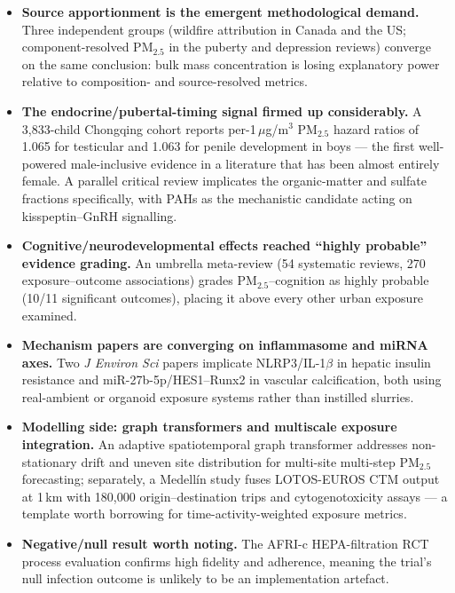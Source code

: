 \documentclass[10pt]{article}
\begin{document}
\footnotesize
\begin{itemize}
\item \textbf{Source apportionment is the emergent methodological demand.} Three
independent groups (wildfire attribution in Canada and the US; component-resolved
PM$_{2.5}$ in the puberty and depression reviews) converge on the same conclusion: bulk
mass concentration is losing explanatory power relative to composition- and
source-resolved metrics.

\item \textbf{The endocrine/pubertal-timing signal firmed up considerably.}
A 3{,}833-child Chongqing cohort reports per-1\,$\mu$g/m$^3$ PM$_{2.5}$ hazard ratios of
1.065 for testicular and 1.063 for penile development in boys --- the first well-powered
male-inclusive evidence in a literature that has been almost entirely female. A parallel
critical review implicates the organic-matter and sulfate fractions specifically, with
PAHs as the mechanistic candidate acting on kisspeptin--GnRH signalling.

\item \textbf{Cognitive/neurodevelopmental effects reached ``highly probable''
evidence grading.} An umbrella meta-review (54 systematic reviews, 270 exposure--outcome
associations) grades PM$_{2.5}$--cognition as highly probable (10/11 significant
outcomes), placing it above every other urban exposure examined.

\item \textbf{Mechanism papers are converging on inflammasome and miRNA axes.}
Two \textit{J Environ Sci} papers implicate NLRP3/IL-1$\beta$ in hepatic insulin
resistance and miR-27b-5p/HES1--Runx2 in vascular calcification, both using
real-ambient or organoid exposure systems rather than instilled slurries.

\item \textbf{Modelling side: graph transformers and multiscale exposure integration.}
An adaptive spatiotemporal graph transformer addresses non-stationary drift and uneven
site distribution for multi-site multi-step PM$_{2.5}$ forecasting; separately, a
Medell\'in study fuses LOTOS-EUROS CTM output at 1\,km with 180{,}000 origin--destination
trips and cytogenotoxicity assays --- a template worth borrowing for time-activity-weighted
exposure metrics.

\item \textbf{Negative/null result worth noting.} The AFRI-c HEPA-filtration RCT process
evaluation confirms high fidelity and adherence, meaning the trial's null infection
outcome is unlikely to be an implementation artefact.
\end{itemize}
\end{document}
